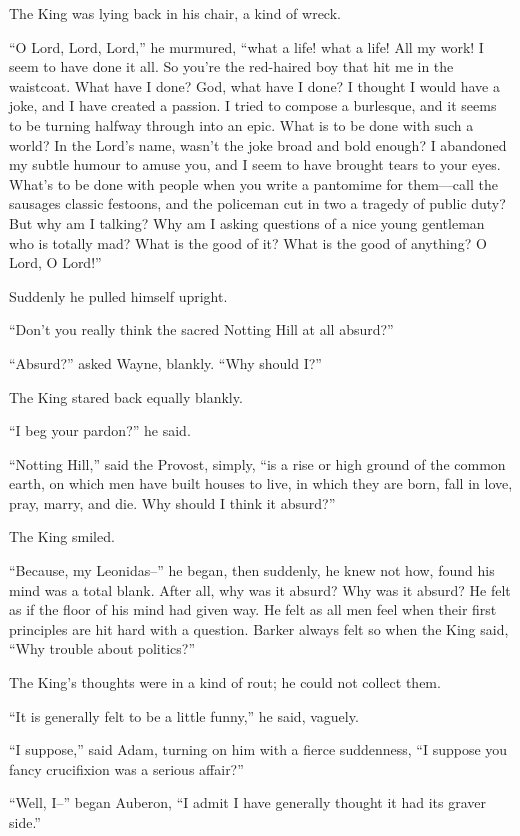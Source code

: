 \documentclass{book}
\begin{document}
The King was lying back in his chair, a kind of wreck.

“O Lord, Lord, Lord,” he murmured, “what a life! what a life! All my work! I seem to have done it all. So you’re the red-haired boy that hit me in the waistcoat. What have I done? God, what have I done? I thought I would have a joke, and I have created a passion. I tried to compose a burlesque, and it seems to be turning halfway through into an epic. What is to be done with such a world? In the Lord’s name, wasn’t the joke broad and bold enough? I abandoned my subtle humour to amuse you, and I seem to have brought tears to your eyes. What’s to be done with people when you write a pantomime for them—call the sausages classic festoons, and the policeman cut in two a tragedy of public duty? But why am I talking? Why am I asking questions of a nice young gentleman who is totally mad? What is the good of it? What is the good of anything? O Lord, O Lord!”

Suddenly he pulled himself upright.

“Don’t you really think the sacred Notting Hill at all absurd?”

“Absurd?” asked Wayne, blankly. “Why should I?”

The King stared back equally blankly.

“I beg your pardon?” he said.

“Notting Hill,” said the Provost, simply, “is a rise or high ground of the common earth, on which men have built houses to live, in which they are born, fall in love, pray, marry, and die. Why should I think it absurd?”

The King smiled.

“Because, my Leonidas–” he began, then suddenly, he knew not how, found his mind was a total blank. After all, why was it absurd? Why was it absurd? He felt as if the floor of his mind had given way. He felt as all men feel when their first principles are hit hard with a question. Barker always felt so when the King said, “Why trouble about politics?”

The King’s thoughts were in a kind of rout; he could not collect them.

“It is generally felt to be a little funny,” he said, vaguely.

“I suppose,” said Adam, turning on him with a fierce suddenness, “I suppose you fancy crucifixion was a serious affair?”

“Well, I–” began Auberon, “I admit I have generally thought it had its graver side.”
\end{document}
